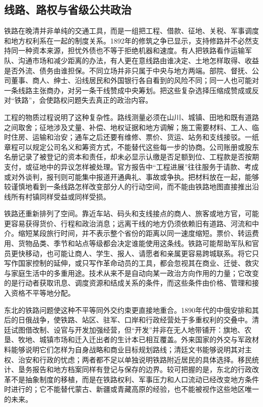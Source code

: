 \subsection{线路、路权与省级公共政治}

铁路在晚清并非单纯的交通工具，而是一组把工程、借款、征地、关税、军事调度和地方权利系在一起的制度关系。1892年的修筑之争已显示，支持修路并不必然支持同一种资本来源，担忧外债也不等于拒绝机器和速度。有人把铁路看作运输军队、沟通市场和减少距离的办法，有人更在意线路由谁决定、土地怎样取得、收益是否外流、债务由谁担保。不同立场并非只属于中央与地方两端。部院、督抚、公司董事、商人、绅士、沿线居民和外国银行各自看到的风险不同；同一人也可能对一条线路主张商办，对另一条干线赞成中央筹划。把这些复杂选择压缩成赞成或反对“铁路”，会使路权问题失去真正的政治内容。

工程的物质过程说明了这种复杂性。路线测量必须在山川、城镇、田地和既有道路之间取舍；征地涉及丈量、补偿、地权证据和地方调解；施工需要材料、工人、临时住房、运输和治安；通车之后还要有维修、票价、货运、站务和支线接驳。一纸章程可以规定公司名义和筹资方式，不能替代这些每一步的协商。公司账册或股东名册记录了被登记的资本和责任，却未必显示认缴是否足额到位、工程款是否按期支付，或征地中的异议怎样被处理。官方报告中“工程进展”往往服务于请款、考成或对外谈判，报刊则可能集中报道开通典礼、事故或争执。把材料放在一起，能够较谨慎地看到一条线路怎样改变部分人的行动空间，而不能由铁路地图直接推出沿线所有村镇同样受益或同样受损。

铁路还重新排列了空间。靠近车站、码头和支线接点的商人、旅客或地方官，可能更容易获得货价、行程和政治消息；远离干线的地方仍须依赖旧有道路、河流和中介。缩短某段旅行时间，并不表示整个省份的距离以同一速度缩短。票价、转运费用、货物品类、季节和站点等级都会决定谁能使用这条线。铁路可能帮助军队和官员更快移动，也可能让商人、学生、报人、请愿者和亲属更容易跨城联系。将它只写作国家控制的延伸，或只写作革命动员的工具，都会忽视其在商业、迁徙、救灾与家庭生活中的多重用途。技术从来不是自动向某一政治方向作用的力量；它改变的是行动者获取讯息、调度资源和结成关系的条件，而这些条件由价格、管理和接入资格不平等地分配。

东北的铁路问题使这种不平等同外交约束更直接地重合。1890年代的中俄安排和其后的日俄战争，使铁路、站区、驻军、口岸和行政经营处于多重权利的交叠中。清廷试图借改制、设官与开发加强经营，但“开发”并非在无人地带铺开：旗地、农垦、牧地、城镇市场和迁入迁出者的生计本已相互覆盖。外来国家的外交与军政材料能够说明它们怎样为自身战略和商业目标规划路线；清廷文书能够说明其对主权、治安和行政的忧虑；两者都不足以单独说明铁路附近居民的具体选择。移民统计、垦务报告和地方档案同样有登记与保存的边界。较可把握的是，东北的行政改革不是抽象制度的移植，而是在铁路权利、军事压力和人口流动已经改变地方条件时进行的；它不能替代蒙古、新疆或青藏高原的经验，也不能被视作这些地区唯一的未来。

